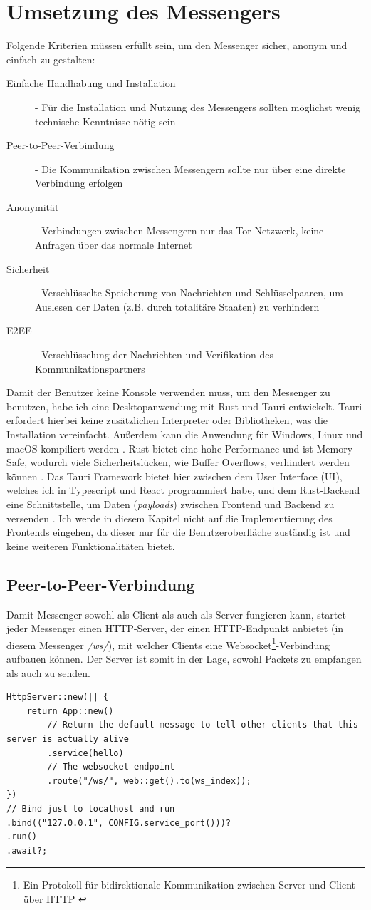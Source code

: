 \documentclass[a4paper,ngerman, headheight=28pt,12pt]{scrartcl}
\newcommand{\vcite}[1]{\cite[vgl.][]{#1}}
\begin{document}
\section{Umsetzung des Messengers}
Folgende Kriterien müssen erfüllt sein, um den Messenger sicher, anonym und einfach zu gestalten:
\begin{description}
  \item[Einfache Handhabung und Installation] - Für die Installation und Nutzung des Messengers sollten möglichst wenig technische Kenntnisse nötig sein
  \item[Peer-to-Peer-Verbindung] - Die Kommunikation zwischen Messengern sollte nur über eine direkte Verbindung erfolgen
  \item[Anonymität] - Verbindungen zwischen Messengern nur das Tor-Netzwerk, keine Anfragen über das normale Internet
  \item[Sicherheit] - Verschlüsselte Speicherung von Nachrichten und Schlüsselpaaren, um Auslesen der Daten (z.B. durch totalitäre Staaten) zu verhindern
  \item[E2EE] - Verschlüsselung der Nachrichten und Verifikation des Kommunikationspartners
\end{description}
Damit der Benutzer keine Konsole verwenden muss, um den Messenger zu benutzen, habe ich eine Desktopanwendung mit Rust und Tauri entwickelt. Tauri erfordert hierbei keine zusätzlichen Interpreter oder Bibliotheken, was die Installation vereinfacht.
Außerdem kann die Anwendung für Windows, Linux und macOS kompiliert werden \vcite{RustCompile}. Rust bietet eine hohe Performance und ist Memory Safe, wodurch viele Sicherheitslücken, wie Buffer Overflows, verhindert werden können \vcite{RustSecurity}. Das Tauri Framework bietet hier zwischen dem User Interface (UI), welches ich in Typescript und React programmiert habe, und dem Rust-Backend eine Schnittstelle, um Daten (\textit{payloads}) zwischen Frontend und Backend zu versenden \vcite{TauriPayloads}. Ich werde in diesem Kapitel nicht auf die Implementierung des Frontends eingehen, da dieser nur für die Benutzeroberfläche zuständig ist und keine weiteren Funktionalitäten bietet.

\subsection{Peer-to-Peer-Verbindung}
Damit Messenger sowohl als Client als auch als Server fungieren kann, startet jeder Messenger einen HTTP-Server, der einen HTTP-Endpunkt anbietet (in diesem Messenger \textit{/ws/}), mit welcher Clients eine Websocket\footnote{Ein Protokoll für bidirektionale Kommunikation zwischen Server und Client über HTTP \vcite{WebsocketDef}}-Verbindung aufbauen können. Der Server ist somit in der Lage, sowohl Packets
zu empfangen als auch zu senden.
\begin{verbatim}
HttpServer::new(|| {
    return App::new()
        // Return the default message to tell other clients that this server is actually alive
        .service(hello)
        // The websocket endpoint
        .route("/ws/", web::get().to(ws_index));
})
// Bind just to localhost and run
.bind(("127.0.0.1", CONFIG.service_port()))?
.run()
.await?;
\end{verbatim}
\end{document}
